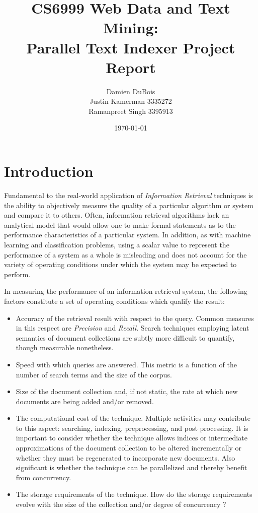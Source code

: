 \documentclass[10pt]{report}
\title{CS6999 Web Data and Text Mining:\\Parallel Text Indexer Project Report}
\author{Damien DuBois\\Justin Kamerman 3335272\\Ramanpreet Singh 3395913}
\date{\today}
\begin{document}
\maketitle
\renewcommand*\thesection{\arabic{section}}

\section{Introduction}
Fundamental to the real-world application of \textit{Information
  Retrieval} techniques is the ability to objectively measure the
quality of a particular algorithm or system and compare it to
others. Often, information retrieval algorithms lack an analytical
model that would allow one to make formal statements as to the
performance characteristics of a particular system. In addition, as with
machine learning and classification problems, using
a scalar value to represent the performance of a system as a whole is
misleading and does not account for the variety of operating
conditions under which the system may be expected to perform.

In measuring the performance of an information retrieval system, the
following factors constitute a set of operating conditions which
qualify the result:

\begin{itemize}
  \item Accuracy of the retrieval result with respect to the
    query. Common measures in this respect are \textit{Precision} and
    \textit{Recall}. Search techniques employing latent semantics of
    document collections are subtly more difficult to quantify, though
    measurable nonetheless.

    \item Speed with which queries are answered. This metric is a
      function of the number of search terms and the size of the
      corpus.

    \item Size of the document collection and, if not static, the rate
      at which new documents are being added and/or removed.
    

    \item The computational cost of the technique. Multiple
      activities may contribute to this aspect: searching, indexing,
      preprocessing, and post processing. It is important to consider
      whether the technique allows indices or intermediate
      approximations of the document collection to be altered
      incrementally or whether they must be regenerated to incorporate
      new documents. Also significant is whether the technique can be
      parallelized and thereby benefit from concurrency.

    \item The storage requirements of the technique. How do the
      storage requirements evolve with the size of the collection
      and/or degree of concurrency ?
\end{itemize}
\end{document}
